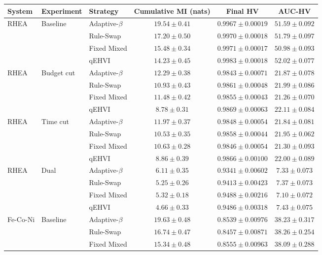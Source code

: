 \begin{tabular}{lllccc}
\toprule
System & Experiment & Strategy & Cumulative MI (nats) & Final HV & AUC-HV \\
\midrule
RHEA & Baseline & Adaptive-$\beta$ & $19.54 \pm 0.41$ & $0.9967 \pm 0.00019$ & $51.59 \pm 0.092$ \\
 &  & Rule-Swap & $17.20 \pm 0.50$ & $0.9970 \pm 0.00018$ & $51.79 \pm 0.097$ \\
 &  & Fixed Mixed & $15.48 \pm 0.34$ & $0.9971 \pm 0.00017$ & $50.98 \pm 0.093$ \\
 &  & qEHVI & $14.23 \pm 0.45$ & $0.9983 \pm 0.00018$ & $52.02 \pm 0.077$ \\
\midrule
RHEA & Budget cut & Adaptive-$\beta$ & $12.29 \pm 0.38$ & $0.9843 \pm 0.00071$ & $21.87 \pm 0.078$ \\
 &  & Rule-Swap & $10.93 \pm 0.43$ & $0.9861 \pm 0.00048$ & $21.99 \pm 0.086$ \\
 &  & Fixed Mixed & $11.48 \pm 0.42$ & $0.9855 \pm 0.00043$ & $21.26 \pm 0.070$ \\
 &  & qEHVI & $8.78 \pm 0.31$ & $0.9869 \pm 0.00063$ & $22.11 \pm 0.084$ \\
\midrule
RHEA & Time cut & Adaptive-$\beta$ & $11.97 \pm 0.37$ & $0.9848 \pm 0.00054$ & $21.84 \pm 0.081$ \\
 &  & Rule-Swap & $10.53 \pm 0.35$ & $0.9858 \pm 0.00044$ & $21.95 \pm 0.062$ \\
 &  & Fixed Mixed & $10.63 \pm 0.28$ & $0.9846 \pm 0.00054$ & $21.30 \pm 0.093$ \\
 &  & qEHVI & $8.86 \pm 0.39$ & $0.9866 \pm 0.00100$ & $22.00 \pm 0.089$ \\
\midrule
RHEA & Dual & Adaptive-$\beta$ & $6.11 \pm 0.35$ & $0.9341 \pm 0.00602$ & $7.33 \pm 0.073$ \\
 &  & Rule-Swap & $5.25 \pm 0.26$ & $0.9413 \pm 0.00423$ & $7.37 \pm 0.073$ \\
 &  & Fixed Mixed & $5.32 \pm 0.18$ & $0.9488 \pm 0.00216$ & $7.10 \pm 0.072$ \\
 &  & qEHVI & $4.66 \pm 0.33$ & $0.9486 \pm 0.00318$ & $7.43 \pm 0.075$ \\
\midrule
Fe-Co-Ni & Baseline & Adaptive-$\beta$ & $19.63 \pm 0.48$ & $0.8539 \pm 0.00976$ & $38.23 \pm 0.317$ \\
 &  & Rule-Swap & $16.74 \pm 0.47$ & $0.8457 \pm 0.00871$ & $38.26 \pm 0.254$ \\
 &  & Fixed Mixed & $15.34 \pm 0.48$ & $0.8555 \pm 0.00963$ & $38.09 \pm 0.288$ \\

\end{tabular}
